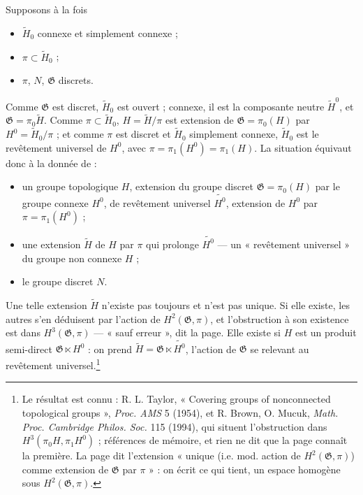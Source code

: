 \documentclass[11pt,a4paper]{article}
\begin{document}
Supposons à la fois
\begin{itemize}
\item[$\alpha$)] $\widetilde{H}_0$ connexe et simplement connexe ;
\item[$\beta$)] $\pi \subset \widetilde{H}_0$ ;
\item[$\gamma$)] $\pi$, $N$, $\mathfrak{G}$ discrets.
\end{itemize}
Comme $\mathfrak{G}$ est discret, $\widetilde{H}_0$ est ouvert ; connexe, il
est la composante neutre $\widetilde{H}^0$, et $\mathfrak{G} = \pi_0
\widetilde{H}$. Comme $\pi \subset \widetilde{H}_0$, $H = \widetilde{H}/\pi$
est extension de $\mathfrak{G} = \pi_0(H)$ par $H^0 = \widetilde{H}_0/\pi$ ;
et comme $\pi$ est discret et $\widetilde{H}_0$ simplement connexe,
$\widetilde{H}_0$ est le revêtement universel de $H^0$, avec $\pi =
\pi_1(H^0) = \pi_1(H)$. La situation équivaut donc à la donnée de :

\begin{itemize}
\item[1°)] un groupe topologique $H$, extension du groupe discret
$\mathfrak{G} = \pi_0(H)$ par le groupe connexe $H^0$, de revêtement
universel $\widetilde{H^0}$, extension de $H^0$ par $\pi = \pi_1(H^0)$ ;
\item[2°)] une extension $\widetilde{H}$ de $H$ par $\pi$ qui prolonge
$\widetilde{H^0}$ — un « revêtement universel » du groupe non connexe $H$ ;
\item[3°)] le groupe discret $N$.
\end{itemize}

Une telle extension $\widetilde{H}$ n'existe pas toujours et n'est pas unique.
Si elle existe, les autres s'en déduisent par l'action de
$H^2(\mathfrak{G}, \pi)$, et l'obstruction à son existence est dans
$H^3(\mathfrak{G}, \pi)$ — « sauf erreur », dit la page. Elle existe si $H$
est un produit semi-direct $\mathfrak{G} \ltimes H^0$ : on prend
$\widetilde{H} = \mathfrak{G} \ltimes \widetilde{H^0}$, l'action de
$\mathfrak{G}$ se relevant au revêtement universel.\footnote{Le résultat est
connu : R. L. Taylor, « Covering groups of nonconnected topological groups »,
\emph{Proc. AMS} 5 (1954), et R. Brown, O. Mucuk, \emph{Math. Proc.
Cambridge Philos. Soc.} 115 (1994), qui situent l'obstruction dans
$H^3(\pi_0 H, \pi_1 H^0)$ ; références de mémoire, et rien ne dit que la
page connaît la première. La page dit l'extension « unique (i.e. mod. action
de $H^2(\mathfrak{G}, \pi)$) comme extension de $\mathfrak{G}$ par $\pi$ » :
on écrit ce qui tient, un espace homogène sous $H^2(\mathfrak{G}, \pi)$.}
\end{document}
